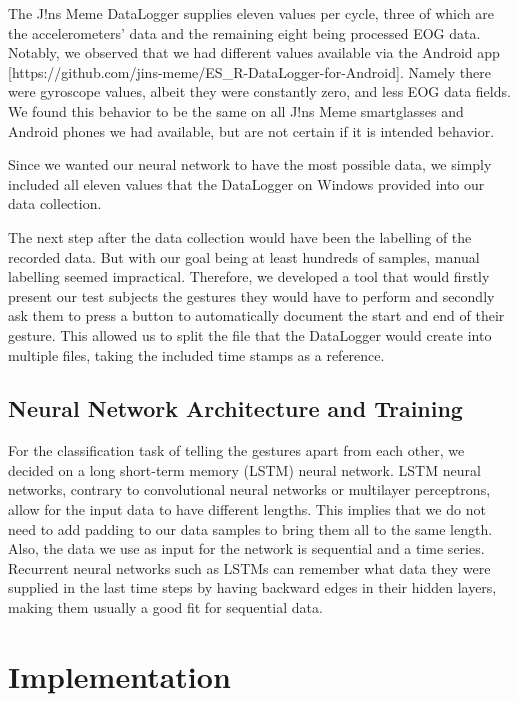 \documentclass[runningheads]{llncs}
\begin{document}
The J!ns Meme DataLogger supplies eleven values per cycle, three of which are the
accelerometers' data and the remaining eight being processed EOG data.
Notably, we observed that we had different values available via the Android app
[https://github.com/jins-meme/ES_R-DataLogger-for-Android]. Namely
there were gyroscope values, albeit they were constantly zero, and less EOG data fields.
We found this behavior to be the same on all J!ns Meme smartglasses and Android phones
we had available, but are not certain if it is intended behavior.

Since we wanted our neural network to have the most possible data, we simply included all
eleven values that the DataLogger on Windows provided into our data collection.

The next step after the data collection would have been the labelling of the recorded data.
But with our goal being at least hundreds of samples, manual labelling seemed impractical.
Therefore, we developed a tool that would firstly present our test subjects the
gestures they would have to perform and secondly ask them to press a button to
automatically document the start and end of their gesture. This allowed us to split the
file that the DataLogger would create into multiple files, taking the included time
stamps as a reference.

\subsection{Neural Network Architecture and Training}
For the classification task of telling the gestures apart from each other, we decided on
a long short-term memory (LSTM) neural network. LSTM neural networks, contrary to convolutional neural networks
or multilayer perceptrons, allow for the input data to have different lengths. This
implies that we do not need to add padding to our data samples to bring them all to the
same length. Also, the data we use as input for the network is sequential and a time
series. Recurrent neural networks such as LSTMs can remember what data they were supplied
in the last time steps by having backward edges in their hidden layers, making them
usually a good fit for sequential data.

\section{Implementation}
\end{document}
